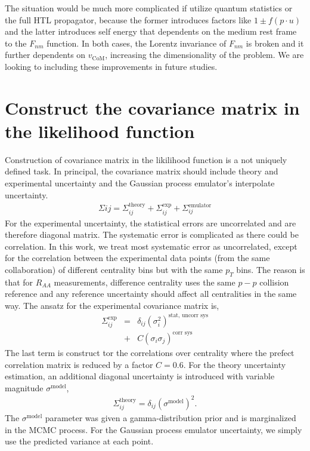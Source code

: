 \documentclass[aps, prc, reprint, amsmath, groupedaddress, nofootinbib]{revtex4-1}
\begin{document}
\begin{appendices}
The situation would be much more complicated if utilize quantum statistics or the full HTL propagator, because the former introduces factors like $1\pm f(p\cdot u)$ and the latter introduces self energy that dependents on the medium rest frame to the $F_{nm}$ function.
In both cases, the Lorentz invariance of $F_{nm}$ is broken and it further dependents on $v_{\textrm{CoM}}$, increasing the dimensionality of the problem. 
We are looking to including these improvements in future studies.

\section{Construct the covariance matrix in the likelihood function}
\label{appendix:sigma}
Construction of covariance matrix in the likilihood function is a not uniquely defined task.
In principal, the covariance matrix should include theory and experimental   uncertainty and the Gaussian process emulator's interpolate uncertainty.
\begin{eqnarray}
\Sigma{ij} = \Sigma^{\textrm{theory}}_{ij} + \Sigma^{\textrm{exp}}_{ij} + \Sigma^{\textrm{emulator}}_{ij}
\end{eqnarray}
For the experimental uncertainty, the statistical errors are uncorrelated and are therefore diagonal matrix. 
The systematic error is complicated as there could be correlation. 
In this work, we treat most systematic error as uncorrelated, except for the correlation between the experimental data points (from the same collaboration) of different centrality bins but with the same $p_T$ bins.
The reason is that for $R_{AA}$ measurements, difference centrality uses the same $p-p$ collision reference and any reference uncertainty should affect all centralities in the same way.
The ansatz for the experimental covariance matrix is, 
\begin{eqnarray}
\Sigma^{\textrm{exp}}_{ij} &=& \delta_{ij}\left(\sigma_i^2\right)^{\textrm{stat, uncorr sys}} \nonumber\\
&+& C \left(\sigma_{i}\sigma_{j}\right)^{\textrm{corr sys}}
\end{eqnarray}
The last term is construct tor the correlations over centrality where the prefect correlation matrix is reduced by a factor $C=0.6$.
For the theory uncertainty estimation, an additional diagonal uncertainty is introduced with variable magnitude $\sigma^{\textrm{model}}$,
\begin{eqnarray}
\Sigma^{\textrm{theory}}_{ij} = \delta_{ij}(\sigma^{\textrm{model}})^2.
\end{eqnarray}
The $\sigma^{\textrm{model}}$ parameter was given a gamma-distribution prior and is marginalized in the MCMC process.
For the Gaussian process emulator uncertainty, we simply use the predicted variance at each point.
\end{appendices}
 
\end{document}
